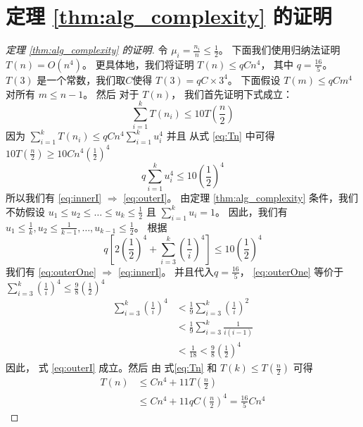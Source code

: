\section{定理 \ref{thm:alg_complexity} 的证明}
\begin{proof}[定理 \ref{thm:alg_complexity} 的证明]
  令
  $\mu_i = \frac{n_i}{n} \leq \frac{1}{2}$。
  下面我们使用归纳法证明
  $T(n) = O(n^4)$。
  更具体地，我们将证明 
  $T(n) \leq q C n^4$， 其中 $ q = \frac{16}{5}$。
  $T(3)$ 是一个常数，我们取$C$使得 $T(3)= q C\times 3^4$。
  下面假设
	$T(m) \leq qC m^4$
  对所有 $m \leq n-1$。
  然后 对于 $T(n)$，
	我们首先证明下式成立：
	\begin{equation}\label{eq:outerI}
	\sum_{i=1}^k T(n_i) \leq 10 T(\frac{n}{2})
	\end{equation}
	因为 $\sum_{i=1}^k T(n_i) \leq qC n^4\sum_{i=1}^k u_i^4$ 并且
  从式 \eqref{eq:Tn} 中可得
  $10 T(\frac{n}{2}) \geq 10Cn^4 (\frac{1}{2})^4$ 
	\begin{equation}\label{eq:innerI}
       q\sum_{i=1}^k u_i^4 \leq 10 (\frac{1}{2})^4 
	\end{equation}
	所以我们有 \eqref{eq:innerI} $\Rightarrow$ \eqref{eq:outerI}。
  由定理 \ref{thm:alg_complexity} 条件，我们不妨假设
  $u_1\leq u_2 \leq \dots \leq u_k \leq \frac{1}{2}$
  且 $\sum_{i=1}^k u_i = 1$。
  因此，我们有
  $u_1 \leq \frac{1}{k}, u_2 \leq \frac{1}{k-1}, \dots, u_{k-1} \leq \frac{1}{2}$。
	根据
  \begin{equation}\label{eq:outerOne}
	 q[2(\frac{1}{2})^4 + \sum_{i=3}^k (\frac{1}{i})^4] \leq 10 (\frac{1}{2})^4
	\end{equation}
	我们有 \eqref{eq:outerOne} $\Rightarrow$ \eqref{eq:innerI}。
  并且代入$q=\frac{16}{5}$，
  \eqref{eq:outerOne} 等价于
	$\sum_{i=3}^k (\frac{1}{i})^4 \leq \frac{9}{8}(\frac{1}{2})^4$
	\begin{align*}
		\sum_{i=3}^k (\frac{1}{i})^4 & < \frac{1}{9}\sum_{i=3}^k \left(\frac{1}{i}
    \right)^2 \\
		& < \frac{1}{9}\sum_{i=3}^k \frac{1}{i(i-1)} \\
		& < \frac{1}{18}
    < \frac{9}{8}\left(\frac{1}{2}
    \right)^4
	\end{align*}
	因此，
  式 \eqref{eq:outerI} 成立。然后
  由 式\eqref{eq:Tn} 和 $T(k) \leq T(\frac{n}{2})$ 可得
	\begin{align}
		T(n)  & \leq Cn^4 + 11T\left(\frac{n}{2} \right) \\
		& \leq C n^4 + 11 q C \left(\frac{n}{2}\right)^4
    = \frac{16}{5} C n^4
	\end{align}
\end{proof}
